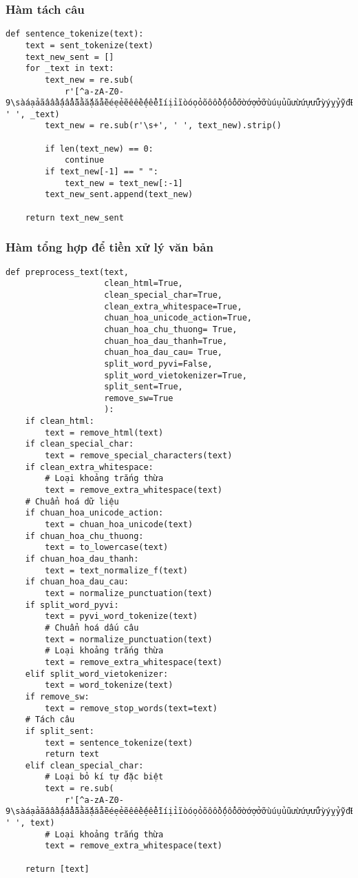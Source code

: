 \subsubsection{Hàm tách câu}


\begin{verbatim}
def sentence_tokenize(text):
    text = sent_tokenize(text)
    text_new_sent = []
    for _text in text:
        text_new = re.sub(
            r'[^a-zA-Z0-9\sàáạảãâầấậẩẫăằắặẳẵèéẹẻẽêềếệểễìíịỉĩòóọỏõôồốộổỗơờớợởỡùúụủũưừứựửữỳýỵỷỹđĐÀÁẠẢÃÂẦẤẬẨẪĂẰẮẶẲẴÈÉẸẺẼÊỀẾỆỂỄÌÍỊỈĨÒÓỌỎÕÔỒỐỘỔỖƠỜỚỢỞỠÙÚỤỦŨƯỪỨỰỬỮỲÝỴỶỸ_]', ' ', _text)
        text_new = re.sub(r'\s+', ' ', text_new).strip()
        
        if len(text_new) == 0:
            continue
        if text_new[-1] == " ":
            text_new = text_new[:-1]
        text_new_sent.append(text_new)

    return text_new_sent
\end{verbatim}

\subsubsection{Hàm tổng hợp để tiền xử lý văn bản}


\begin{verbatim}
def preprocess_text(text,
                    clean_html=True,
                    clean_special_char=True,
                    clean_extra_whitespace=True,
                    chuan_hoa_unicode_action=True,
                    chuan_hoa_chu_thuong= True,
                    chuan_hoa_dau_thanh=True,
                    chuan_hoa_dau_cau= True,
                    split_word_pyvi=False,
                    split_word_vietokenizer=True,
                    split_sent=True,
                    remove_sw=True
                    ):
    if clean_html:
        text = remove_html(text)
    if clean_special_char:
        text = remove_special_characters(text)
    if clean_extra_whitespace:
        # Loại khoảng trắng thừa
        text = remove_extra_whitespace(text)
    # Chuẩn hoá dữ liệu
    if chuan_hoa_unicode_action:
        text = chuan_hoa_unicode(text)
    if chuan_hoa_chu_thuong:
        text = to_lowercase(text)
    if chuan_hoa_dau_thanh:
        text = text_normalize_f(text)
    if chuan_hoa_dau_cau:
        text = normalize_punctuation(text)
    if split_word_pyvi:
        text = pyvi_word_tokenize(text)
        # Chuẩn hoá dấu câu
        text = normalize_punctuation(text)
        # Loại khoảng trắng thừa
        text = remove_extra_whitespace(text)
    elif split_word_vietokenizer:
        text = word_tokenize(text)
    if remove_sw:
        text = remove_stop_words(text=text)
    # Tách câu
    if split_sent:
        text = sentence_tokenize(text)
        return text
    elif clean_special_char:
        # Loại bỏ kí tự đặc biệt
        text = re.sub(
            r'[^a-zA-Z0-9\sàáạảãâầấậẩẫăằắặẳẵèéẹẻẽêềếệểễìíịỉĩòóọỏõôồốộổỗơờớợởỡùúụủũưừứựửữỳýỵỷỹđĐÀÁẠẢÃÂẦẤẬẨẪĂẰẮẶẲẴÈÉẸẺẼÊỀẾỆỂỄÌÍỊỈĨÒÓỌỎÕÔỒỐỘỔỖƠỜỚỢỞỠÙÚỤỦŨƯỪỨỰỬỮỲÝỴỶỸ_]', ' ', text)
        # Loại khoảng trắng thừa
        text = remove_extra_whitespace(text)

    return [text]
\end{verbatim}



